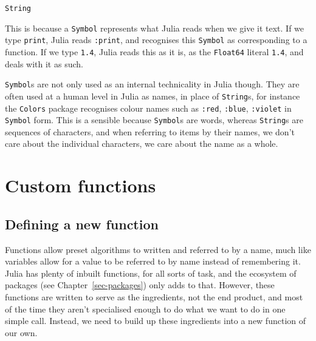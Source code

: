 \documentclass[
  letterpaper,
  DIV=11,
  numbers=noendperiod]{scrreprt}
\begin{document}
\begin{verbatim}
String
\end{verbatim}

This is because a \texttt{Symbol} represents what Julia reads when we
give it text. If we type \texttt{print}, Julia reads \texttt{:print},
and recognises this \texttt{Symbol} as corresponding to a function. If
we type \texttt{1.4}, Julia reads this as it is, as the \texttt{Float64}
literal \texttt{1.4}, and deals with it as such.

\texttt{Symbol}s are not only used as an internal technicality in Julia
though. They are often used at a human level in Julia as names, in place
of \texttt{String}s, for instance the \texttt{Colors} package recognises
colour names such as \texttt{:red}, \texttt{:blue}, \texttt{:violet} in
\texttt{Symbol} form. This is a sensible because \texttt{Symbol}s are
words, whereas \texttt{String}s are sequences of characters, and when
referring to items by their names, we don't care about the individual
characters, we care about the name as a whole.

\hypertarget{custom-functions}{%
\section{Custom functions}\label{custom-functions}}

\hypertarget{defining-a-new-function}{%
\subsection{Defining a new function}\label{defining-a-new-function}}

Functions allow preset algorithms to written and referred to by a name,
much like variables allow for a value to be referred to by name instead
of remembering it. Julia has plenty of inbuilt functions, for all sorts
of task, and the ecosystem of packages (see Chapter~\ref{sec-packages})
only adds to that. However, these functions are written to serve as the
ingredients, not the end product, and most of the time they aren't
specialised enough to do what we want to do in one simple call. Instead,
we need to build up these ingredients into a new function of our own.
\end{document}
